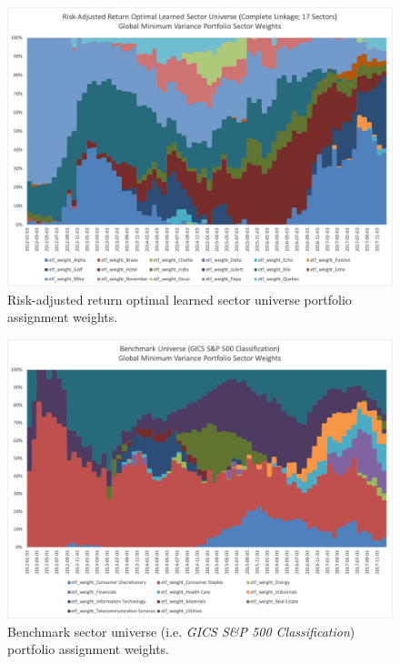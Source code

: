 \documentclass[../main.tex]{subfiles}
\begin{document}
\newpage
\begin{figure}
    \centering
    \includegraphics[width=\linewidth]{images/complete_17_sector_assignments.png}
    \caption{Risk-adjusted return optimal learned sector universe portfolio assignment weights.}
    \label{fig:appendix_weights:sharpe_optimal}
\end{figure}


\newpage
\begin{figure}
    \centering
    \includegraphics[width=\linewidth]{images/sp500_sector_assignments.png}
    \caption{Benchmark sector universe (i.e. \textit{GICS S\&P 500 Classification}) portfolio assignment weights.}
    \label{fig:appendix_weights:benchmark}
\end{figure}
\end{document}
